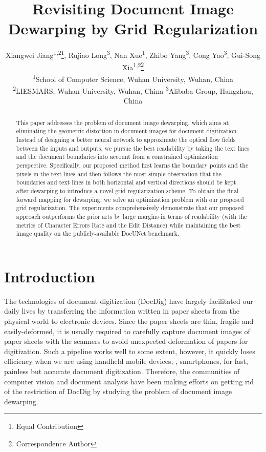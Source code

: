 \documentclass[10pt,twocolumn,letterpaper]{article}
\begin{document}
\title{Revisiting Document Image Dewarping by Grid Regularization}




\author{Xiangwei Jiang\textsuperscript{1,2}\thanks{Equal Contribution}, Rujiao Long\textsuperscript{3}\footnotemark[1], Nan Xue\textsuperscript{1}, Zhibo Yang\textsuperscript{3}, Cong Yao\textsuperscript{3}, Gui-Song Xia\textsuperscript{1,2}\thanks{Correspondence Author}\\ 
\textsuperscript{1}School of Computer Science, Wuhan University, Wuhan, China\\ 
\textsuperscript{2}LIESMARS, Wuhan University, Wuhan, China \qquad
\textsuperscript{3}Alibaba-Group, Hangzhou, China
}

\maketitle

\begin{abstract}
This paper addresses the problem of document image dewarping, which aims at eliminating the geometric distortion in document images for document digitization. Instead of designing a better neural network to approximate the optical flow fields between the inputs and outputs, we pursue the best readability by taking the text lines and the document boundaries into account from a constrained optimization perspective.  Specifically, our proposed method first learns the boundary points and the pixels in the text lines and then follows the most simple observation that the boundaries and text lines in both horizontal and vertical directions should be kept after dewarping to introduce a novel grid regularization scheme. To obtain the final forward mapping for dewarping, we solve an optimization problem with our proposed grid regularization.
The experiments comprehensively demonstrate that our proposed approach outperforms the prior arts by large margins in terms of readability (with the metrics of Character Errors Rate and the Edit Distance) while maintaining the best image quality on the publicly-available DocUNet benchmark.
\vspace{-1.5em} 
\end{abstract}
\section{Introduction}
\label{sec:intro}


The technologies of document digitization (DocDig) have largely facilitated our daily lives by transferring the information written in paper sheets from the physical world to electronic devices. Since the paper sheets are thin, fragile and easily-deformed, it is usually required to carefully capture document images of paper sheets with the scanners to avoid unexpected deformation of papers for digitization. Such a pipeline works well to some extent, however, it quickly loses efficiency when we are using handheld mobile devices, \eg, smartphones, for fast, painless but accurate document digitization. 
Therefore, the communities of computer vision and document analysis have been making efforts on getting rid of the restriction of DocDig by studying the problem of document image dewarping. 
\end{document}
